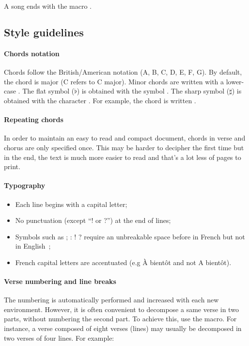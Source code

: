 A song ends with the macro .

\subsection{Style guidelines}

\paragraph{Chords notation}
Chords follow the British/American notation (A, B, C, D, E, F, G). By
default, the chord is major (C refers to C major). Minor chords are
written with a lower-case . The flat symbol ($\flat$) is
obtained with the symbol \command{\&}. The sharp symbol ($\sharp$) is
obtained with the character \command{\#}. For example, the
 chord is written \latexcom{[A\&m]}.

\paragraph{Repeating chords}
In order to maintain an easy to read and compact document, chords in
verse and chorus are only specified once. This may be harder to
decipher the first time but in the end, the text is much more easier
to read and that's a lot less of pages to print.

\paragraph{Typography}
\begin{itemize}
  \item Each line begins with a capital letter;
  \item No punctuation (except ``! or ?'') at the end of lines;
  \item Symbols such as {\og}; : ! ?{\fg} require an unbreakable space
    before in French but not in English~;
  \item French capital letters are accentuated (e.g {\og}À bientôt{\fg}
    and not {\og}A bientôt{\fg}).
\end{itemize}

\paragraph{Verse numbering and line breaks}
The numbering is automatically performed and increased with each new
 environment. However, it is often convenient to
decompose a same verse in two parts, without numbering the second
part. To achieve this, use the  macro. For
instance, a verse composed of eight verses (lines) may usually be
decomposed in two verses of four lines. For example:

